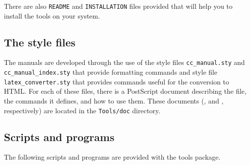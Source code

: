 There are also {\tt README} and {\tt INSTALLATION} files provided that
will help you to install the tools on your system.

\subsection{The style files}
\label{subsec:manual_style_files}

The manuals are developed through the use of the style files 
{\tt cc\_manual.sty} and 
{\tt cc\_manual\_index.sty}
that provide formatting
commands and style file {\tt latex\_converter.sty}
that provides commands
useful for the conversion to HTML.  
For each of these files, there is a PostScript document describing 
the file, the commands it defines, and how to use them.  These documents 
(, 
 and
, respectively)
are located in the {\tt Tools/doc} 
directory.

\subsection{Scripts and programs}
\label{sec:manual_scripts}

The following scripts and programs are provided with the tools package.


